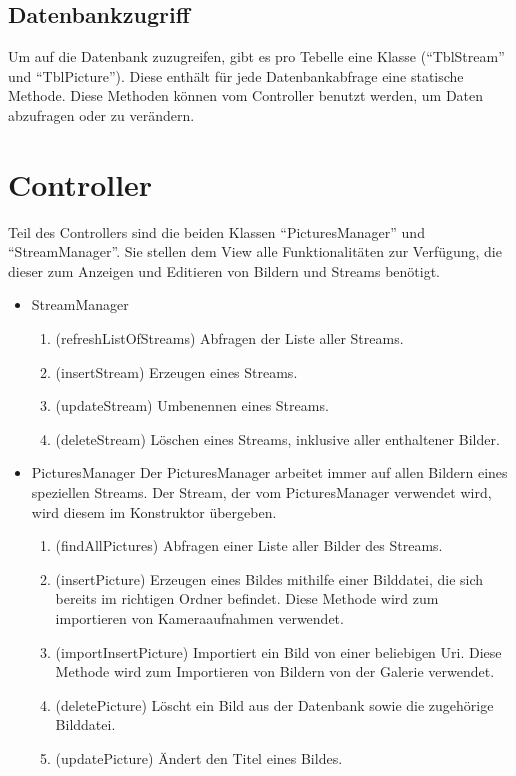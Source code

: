 \subsection{Datenbankzugriff}
Um auf die Datenbank zuzugreifen, gibt es pro Tebelle eine Klasse (\enquote{TblStream} und \enquote{TblPicture}). Diese enthält für jede Datenbankabfrage eine statische Methode. Diese Methoden können vom Controller benutzt werden, um Daten abzufragen oder zu verändern.

\section{Controller}

Teil des Controllers sind die beiden Klassen \enquote{PicturesManager} und \enquote{StreamManager}. Sie stellen dem View alle Funktionalitäten zur Verfügung, die dieser zum Anzeigen und Editieren von Bildern und Streams benötigt.

\begin{itemize}
\item{StreamManager}
\begin{enumerate}
\item (refreshListOfStreams) Abfragen der Liste aller Streams.
\item (insertStream) Erzeugen eines Streams.
\item (updateStream) Umbenennen eines Streams.
\item (deleteStream) Löschen eines Streams, inklusive aller enthaltener Bilder.
\end{enumerate}
\item{PicturesManager} \newline
Der PicturesManager arbeitet immer auf allen Bildern eines speziellen Streams. Der Stream, der vom PicturesManager verwendet wird, wird diesem im Konstruktor übergeben.
\begin{enumerate}
\item (findAllPictures) Abfragen einer Liste aller Bilder des Streams.
\item (insertPicture) Erzeugen eines Bildes mithilfe einer Bilddatei, die sich bereits im richtigen Ordner befindet. Diese Methode wird zum importieren von Kameraaufnahmen verwendet.
\item (importInsertPicture) Importiert ein Bild von einer beliebigen Uri. Diese Methode wird zum Importieren von Bildern von der Galerie verwendet.
\item (deletePicture) Löscht ein Bild aus der Datenbank sowie die zugehörige Bilddatei.
\item (updatePicture) Ändert den Titel eines Bildes.
\end{enumerate}
\end{itemize}

